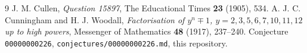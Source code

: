 \documentclass[11pt]{article}
\theoremstyle{definition}
\begin{document}
\begin{thebibliography}{9}
J. M. Cullen, \emph{Question 15897}, The Educational Times \textbf{23}
(1905), 534.
A. J. C. Cunningham and H. J. Woodall, \emph{Factorisation of
\(y^n\mp 1\), \(y=2,3,5,6,7,10,11,12\) up to high powers},
Messenger of Mathematics \textbf{48} (1917), 237--240.
Conjecture \texttt{00000000226}, \texttt{conjectures/00000000226.md},
this repository.
\end{thebibliography}
\end{document}
